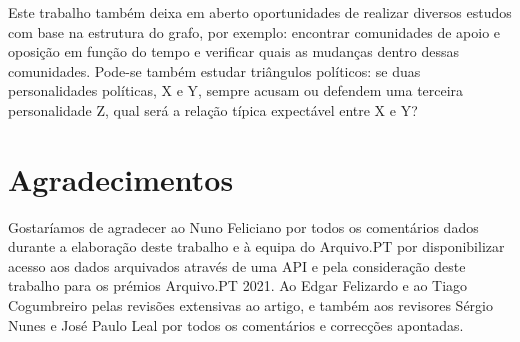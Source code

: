\documentclass[a4paper, twocolumn, 11pt, twoside]{article}
\begin{document}
Este trabalho também deixa em aberto oportunidades de realizar diversos estudos com base na estrutura do grafo, por exemplo: encontrar comunidades de apoio e oposição em função do tempo e verificar quais as mudanças dentro dessas comunidades. Pode-se também estudar triângulos políticos: se duas personalidades políticas, X e Y, sempre acusam ou defendem uma terceira personalidade Z, qual será a relação típica expectável entre X e Y?

\section*{Agradecimentos}

Gostaríamos de agradecer ao Nuno Feliciano por todos os comentários dados durante a elaboração deste trabalho e à equipa do Arquivo.PT por disponibilizar acesso aos dados arquivados através de uma API e pela consideração deste trabalho para os prémios Arquivo.PT 2021. Ao Edgar Felizardo e ao Tiago Cogumbreiro pelas revisões extensivas ao artigo, e também aos revisores Sérgio Nunes e José Paulo Leal por todos os comentários e correcções apontadas.


\end{document}
